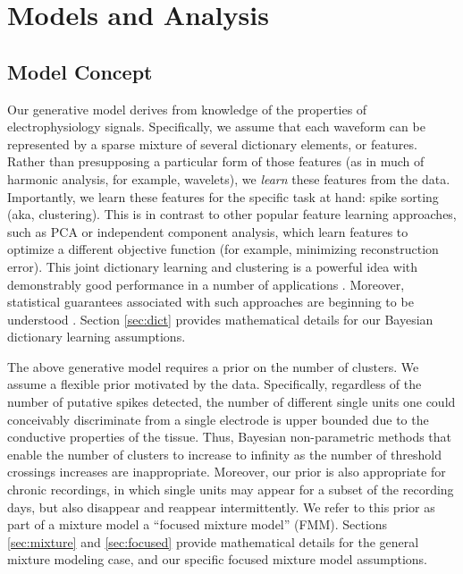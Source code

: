 \documentclass[journal]{IEEEtran}
\begin{document}
\section{Models and Analysis\label{sec:models}}

\subsection{Model Concept} %
\label{sub:concept1}

Our generative model derives from knowledge of the properties of electrophysiology signals.  
Specifically, we assume that each waveform can be represented by a sparse mixture of several dictionary elements, or features.  Rather than presupposing a particular form of those features (as in much of harmonic analysis, for example, wavelets), we \emph{learn} these features from the data.  Importantly, we learn these features for the specific task at hand: spike sorting (aka, clustering).  This is in contrast to other popular feature learning approaches, such as PCA or independent component analysis, which learn features to optimize a different objective function (for example, minimizing reconstruction error).  This joint dictionary learning and clustering is a powerful idea with demonstrably good performance in a number of applications \cite{Zhou2012}.  Moreover, statistical guarantees associated with such approaches are beginning to be understood \cite{Spielman2012}.  Section \ref{sec:dict} provides mathematical details for our Bayesian dictionary learning assumptions.

The above generative model requires a prior on the number of clusters.  We assume a flexible prior motivated by the data.  Specifically, regardless of the number of putative spikes detected, the number of different single units one could conceivably discriminate from a single electrode is upper bounded due to the conductive properties of the tissue.  Thus, Bayesian non-parametric methods that enable the number of clusters to increase to infinity as the number of threshold crossings increases are inappropriate.  Moreover, our prior is also appropriate for chronic recordings, in which single units may appear for a subset of the recording days, but also disappear and reappear intermittently.  We refer to this prior as part of a mixture model a ``focused mixture model'' (FMM).  Sections \ref{sec:mixture} and \ref{sec:focused} provide mathematical details for the general mixture modeling case, and our specific focused mixture model assumptions.
\end{document}
